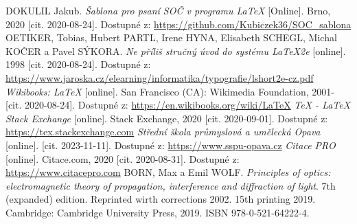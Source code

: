 \documentclass[12pt, a4paper,
twoside,        %
openright
]{report}
\let\oldchapter\chapter
\renewcommand{\chapter}{
	\clearpage
	\pagestyle{fancy}
	\oldchapter
}
\begin{document}
	
	\begin{thebibliography}{99}
		 DOKULIL Jakub. \textit{Šablona pro psaní SOČ v programu \LaTeX} [Online]. Brno, 2020 [cit. 2020-08-24]. Dostupné z: \url{https://github.com/Kubiczek36/SOC_sablona}
		OETIKER, Tobias, Hubert PARTL, Irene HYNA, Elisabeth SCHEGL, Michal KOČER a Pavel SÝKORA. \textit{Ne příliš stručný úvod do systému LaTeX2e} [online]. 1998 [cit. 2020-08-24]. Dostupné z: \url{https://www.jaroska.cz/elearning/informatika/typografie/lshort2e-cz.pdf}
		\textit{Wikibooks: LaTeX} [online]. San Francisco (CA): Wikimedia Foundation, 2001- [cit. 2020-08-24]. Dostupné z: \url{https://en.wikibooks.org/wiki/LaTeX}
		 \textit{TeX - LaTeX Stack Exchange} [online]. Stack Exchange, 2020 [cit. 2020-09-01]. Dostupné z: \url{https://tex.stackexchange.com}
		 \textit{Střední škola průmyslová a umělecká Opava} [online]. [cit. 2023-11-11]. Dostupné z: \url{https://www.sspu-opava.cz}
		\textit{Citace PRO} [online]. Citace.com, 2020 [cit. 2020-08-31]. Dostupné z: \url{https://www.citacepro.com}
		 BORN, Max a Emil WOLF. \textit{Principles of optics: electromagnetic theory of propagation, interference and diffraction of light}. 7th (expanded) edition. Reprinted wirth corrections 2002. 15th printing 2019. Cambridge: Cambridge University Press, 2019. ISBN 978-0-521-64222-4.
	\end{thebibliography}
	
	\listoffigures
	
	\listoftables
	
	\appendix %
	
	\titleformat{\chapter}[block]{\scshape\bfseries\LARGE}{Příloha \thechapter}{10pt}{\vspace{0pt}}[\vspace{-22pt}] %
	

	
	
\end{document}
